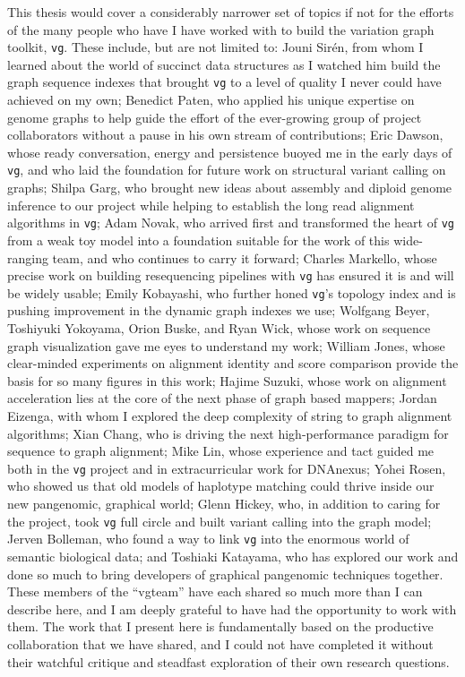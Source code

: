 \begin{acknowledgements}
  This thesis would cover a considerably narrower set of topics if not for the efforts of the many people who have I have worked with to build the variation graph toolkit, {\tt vg}.
  These include, but are not limited to:
  Jouni Sir\'{e}n, from whom I learned about the world of succinct data structures as I watched him build the graph sequence indexes that brought {\tt vg} to a level of quality I never could have achieved on my own;
  Benedict Paten, who applied his unique expertise on genome graphs to help guide the effort of the ever-growing group of project collaborators without a pause in his own stream of contributions;
  Eric Dawson, whose ready conversation, energy and persistence buoyed me in the early days of {\tt vg}, and who laid the foundation for future work on structural variant calling on graphs;
  Shilpa Garg, who brought new ideas about assembly and diploid genome inference to our project while helping to establish the long read alignment algorithms in {\tt vg};
  Adam Novak, who arrived first and transformed the heart of {\tt vg} from a weak toy model into a foundation suitable for the work of this wide-ranging team, and who continues to carry it forward;
  Charles Markello, whose precise work on building resequencing pipelines with {\tt vg} has ensured it is and will be widely usable;
  Emily Kobayashi, who further honed {\tt vg}'s topology index and is pushing improvement in the dynamic graph indexes we use;
  Wolfgang Beyer, Toshiyuki Yokoyama, Orion Buske, and Ryan Wick, whose work on sequence graph visualization gave me eyes to understand my work;
  William Jones, whose clear-minded experiments on alignment identity and score comparison provide the basis for so many figures in this work;
  Hajime Suzuki, whose work on alignment acceleration lies at the core of the next phase of graph based mappers;
  Jordan Eizenga, with whom I explored the deep complexity of string to graph alignment algorithms;
  Xian Chang, who is driving the next high-performance paradigm for sequence to graph alignment;
  Mike Lin, whose experience and tact guided me both in the {\tt vg} project and in extracurricular work for DNAnexus;
  Yohei Rosen, who showed us that old models of haplotype matching could thrive inside our new pangenomic, graphical world;
  Glenn Hickey, who, in addition to caring for the project, took {\tt vg} full circle and built variant calling into the graph model;
  Jerven Bolleman, who found a way to link {\tt vg} into the enormous world of semantic biological data;
  and Toshiaki Katayama, who has explored our work and done so much to bring developers of graphical pangenomic techniques together.
  These members of the ``vgteam'' have each shared so much more than I can describe here, and I am deeply grateful to have had the opportunity to work with them.
  The work that I present here is fundamentally based on the productive collaboration that we have shared, and I could not have completed it without their watchful critique and steadfast exploration of their own research questions.


\end{acknowledgements}
